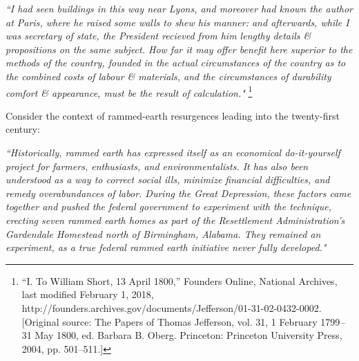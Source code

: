 \begin{flushright}
\small{
\textit{``I had seen buildings in this way near Lyons, and moreover had known the author at Paris, where he raised some walls to shew his manner: and afterwards, while I was secretary of state, the President recieved from him lengthy details \& propositions on the same subject. How far it may offer benefit here superior to the methods of the country, founded in the actual circumstances of the country as to the combined costs of labour \& materials, and the circumstances of durability comfort \& appearance, must be the result of calculation."}} \footnote{``I. To William Short, 13 April 1800,” Founders Online, National Archives, last modified February 1, 2018, http://founders.archives.gov/documents/Jefferson/01-31-02-0432-0002. [Original source: The Papers of Thomas Jefferson, vol. 31, 1 February 1799 – 31 May 1800, ed. Barbara B. Oberg. Princeton: Princeton University Press, 2004, pp. 501–511.]}
\end{flushright}

Consider the context of rammed-earth resurgences leading into the twenty-first century:

\begin{flushright}
\small{
\textit{
``Historically, rammed earth has expressed itself as an economical do-it-yourself project for farmers, enthusiasts, and environmentalists. It has also been understood as a way to correct social ills, minimize financial difficulties, and remedy overabundances of labor. During the Great Depression, these factors came together and pushed the federal government to experiment with the technique, erecting seven rammed earth homes as part of the Resettlement Administration’s Gardendale Homestead north of Birmingham, Alabama. They remained an experiment, as a true federal rammed earth initiative never fully developed."}}\cite{GARDENDALE}
\end{flushright}

